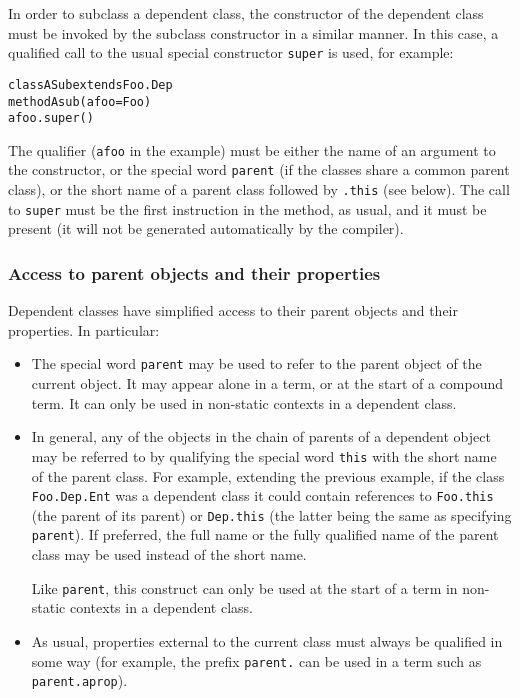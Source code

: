 In order to subclass a dependent class, the constructor of the dependent
class must be invoked by the subclass constructor in a similar manner.
In this case, a qualified call to the usual special
constructor \texttt{super} is used, for example:
\begin{alltt}
class ASub extends Foo.Dep
  method Asub(afoo=Foo)
    afoo.super()
\end{alltt}
 The qualifier (\texttt{afoo} in the example) must be either the name of
an argument to the constructor, or the special word \texttt{parent} (if
the classes share a common parent class), or the short name of a parent
class followed by \texttt{.this} (see below).
The call to \texttt{super} must be the first instruction in the method, as
usual, and it must be present (it will not be generated automatically by
the compiler).
\subsubsection{Access to parent objects and their properties}
 
Dependent classes have simplified access to their parent objects and
their properties.
In particular:
\begin{itemize}
\item The special word \texttt{parent} may be used to refer to the
parent object of the current object.  It may appear alone in a term, or
at the start of a compound term.
It can only be used in non-static contexts in a dependent class.
\item 
{}
In general, any of the objects in the chain of parents of a dependent
object may be referred to by qualifying the special word \texttt{this}
with the short name of the parent class.
For example, extending the previous example, if the
class \texttt{Foo.Dep.Ent} was a dependent class it could contain
references to \texttt{Foo.this} (the parent of its parent)
or \texttt{Dep.this} (the latter being the same as
specifying \texttt{parent}).  If preferred, the full name or the fully
qualified name of the parent class may be used instead of the short
name.
 
Like \texttt{parent}, this construct can only be used at the start of a
term in non-static contexts in a dependent class.
\item 
{}
As usual, properties external to the current class must always be
qualified in some way (for example, the prefix \texttt{parent.} can be
used in a term such as \texttt{parent.aprop}).
\end{itemize}
